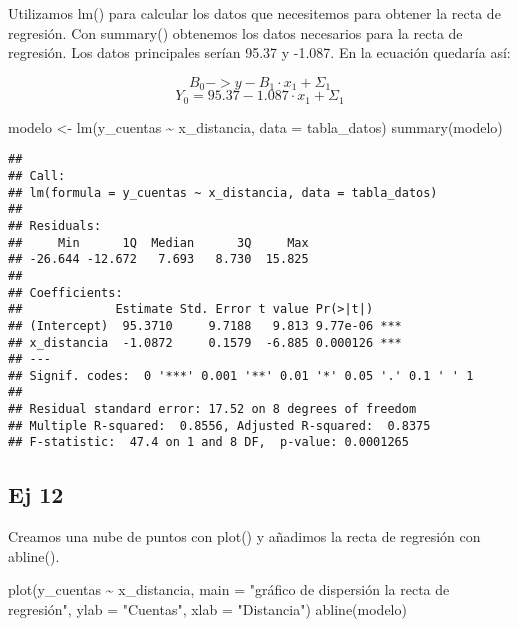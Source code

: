 \documentclass[
]{article}
\newenvironment{Shaded}{\begin{snugshade}}{\end{snugshade}}
\newcommand{\AttributeTok}[1]{\textcolor[rgb]{0.77,0.63,0.00}{#1}}
\newcommand{\FunctionTok}[1]{\textcolor[rgb]{0.00,0.00,0.00}{#1}}
\newcommand{\NormalTok}[1]{#1}
\newcommand{\OtherTok}[1]{\textcolor[rgb]{0.56,0.35,0.01}{#1}}
\newcommand{\SpecialCharTok}[1]{\textcolor[rgb]{0.00,0.00,0.00}{#1}}
\newcommand{\StringTok}[1]{\textcolor[rgb]{0.31,0.60,0.02}{#1}}
\begin{document}
Utilizamos lm() para calcular los datos que necesitemos para obtener la
recta de regresión. Con summary() obtenemos los datos necesarios para la
recta de regresión. Los datos principales serían 95.37 y -1.087. En la
ecuación quedaría así:

\[B_0 -> y - B_1 · x_1 + Σ_1\] \[Y_0 = 95.37 - 1.087 · x_1 + Σ_1\]

\begin{Shaded}
\begin{Highlighting}[]
\NormalTok{modelo }\OtherTok{\textless{}{-}} \FunctionTok{lm}\NormalTok{(y\_cuentas }\SpecialCharTok{\textasciitilde{}}\NormalTok{ x\_distancia, }\AttributeTok{data =}\NormalTok{ tabla\_datos)}
\FunctionTok{summary}\NormalTok{(modelo)}
\end{Highlighting}
\end{Shaded}

\begin{verbatim}
## 
## Call:
## lm(formula = y_cuentas ~ x_distancia, data = tabla_datos)
## 
## Residuals:
##     Min      1Q  Median      3Q     Max 
## -26.644 -12.672   7.693   8.730  15.825 
## 
## Coefficients:
##             Estimate Std. Error t value Pr(>|t|)    
## (Intercept)  95.3710     9.7188   9.813 9.77e-06 ***
## x_distancia  -1.0872     0.1579  -6.885 0.000126 ***
## ---
## Signif. codes:  0 '***' 0.001 '**' 0.01 '*' 0.05 '.' 0.1 ' ' 1
## 
## Residual standard error: 17.52 on 8 degrees of freedom
## Multiple R-squared:  0.8556, Adjusted R-squared:  0.8375 
## F-statistic:  47.4 on 1 and 8 DF,  p-value: 0.0001265
\end{verbatim}

\hypertarget{ej-12}{%
\subsection{Ej 12}\label{ej-12}}

Creamos una nube de puntos con plot() y añadimos la recta de regresión
con abline().

\begin{Shaded}
\begin{Highlighting}[]
\FunctionTok{plot}\NormalTok{(y\_cuentas }\SpecialCharTok{\textasciitilde{}}\NormalTok{ x\_distancia, }\AttributeTok{main =} \StringTok{"gráfico de dispersión la recta de regresión"}\NormalTok{, }\AttributeTok{ylab =} \StringTok{"Cuentas"}\NormalTok{, }\AttributeTok{xlab =} \StringTok{"Distancia"}\NormalTok{)}
\FunctionTok{abline}\NormalTok{(modelo)}
\end{Highlighting}
\end{Shaded}
\end{document}
